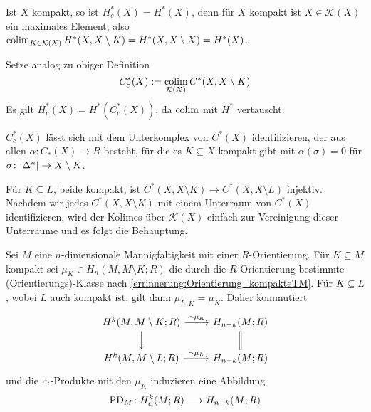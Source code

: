 \begin{beispiel}[{name=[{Kohomologie mit kompaktem Träger von kompakten Räumen}]}]
	Ist $X$ kompakt, so ist $H^*_c(X)= H^*(X)$, denn für $X$ kompakt ist $X \in \mathcal{K}(X)$ ein maximales Element, also $\operatorname*{colim}_{K \in \mathcal{K}(X)} H^*(X,X \setminus K) = H^*(X,X\setminus X) = H^*(X)$.
\end{beispiel}

\begin{definition}[{name=[{Kokettenkomplex mit kompaktem Träger}]}]
	Setze analog zu obiger Definition 
	\[
		C_c^*(X) := \operatorname*{colim}_{\mathcal{K}(X)} C^*(X,X\setminus K)
	\]
	Es gilt $H^*_c(X) = H^*( C^*_c(X))$, da $\operatorname*{colim}$ mit $H^*$ vertauscht.
\end{definition}

\begin{lemma}[{name=[{Kokettenkomplex mit kompaktem Träger als Unterkomplex}]}]
	$C^*_c(X)$ lässt sich mit dem Unterkomplex von $C^*(X)$ identifizieren, der aus allen $\alpha \colon C_*(X) \to R$ besteht, für die es $K \subseteq X$ kompakt gibt mit $\alpha(\sigma)=0$ für $\sigma \colon \abs*{\Delta^n} \to X\setminus K$.
\end{lemma}
\begin{beweis}
	Für $K \subseteq L$, beide kompakt, ist $C^*(X,X\setminus K)\to C^*(X,X\setminus L)$ injektiv.
	Nachdem wir jedes $C^*(X,X\setminus K)$ mit einem Unterraum von $C^*(X)$ identifizieren, wird der Kolimes über $\mathcal{K}(X)$ einfach zur Vereinigung dieser Unterräume und es folgt die Behauptung.
\end{beweis}

\begin{bemerkung}[{name=[{Herleitung der Poincaré-Dualitäts-Abbildung}]},label=bem:herleitung_PD]
	Sei $M $ eine $n$-dimensionale Mannigfaltigkeit mit einer $R$-Orientierung. Für $K \subseteq M$ kompakt sei $\mu_K \in H_n(M,M \setminus K;R)$ die durch die $R$-Orientierung bestimmte (Orientierungs)-Klasse nach \autoref{errinnerung:Orientierung_kompakteTM}.
	Für $K \subseteq L$, wobei $L$ auch kompakt ist, gilt dann $\mu_L|_K = \mu_K$.
	Daher kommutiert
	\[
		\begin{tikzcd}
			H^k(M,M \setminus K;R)\dar \rar["\capp\mu_K"] &  H_{n-k}(M;R) \dar[equal] \\
			H^k(M,M \setminus L;R) \rar["\capp\mu_L"] & H_{n-k}(M;R)
		\end{tikzcd}
	\]
	und die $\smallfrown$-Produkte mit den $\mu_K$ induzieren eine Abbildung 
	\[
		\operatorname{PD}_M \colon H^k_c(M;R) \longrightarrow H_{n-k}(M;R)
	\]
\end{bemerkung}

